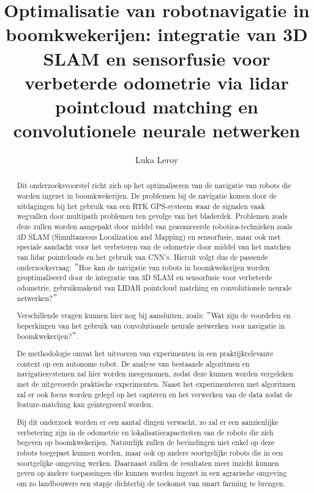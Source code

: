 \documentclass{hogent-article}
\title{Optimalisatie van robotnavigatie in boomkwekerijen: integratie van 3D SLAM en sensorfusie voor verbeterde odometrie via lidar pointcloud matching en convolutionele neurale netwerken}
\author{Luka Leroy}
\begin{document}
\begin{abstract}
  Dit onderzoeksvoorstel richt zich op het optimaliseren van de navigatie van robots die worden ingezet in boomkwekerijen.
  De problemen bij de navigatie komen door de uitdagingen bij het gebruik van een RTK GPS-systeem waar de signalen vaak wegvallen door multipath problemen ten gevolge van het bladerdek.
  Problemen zoals deze zullen worden aangepakt door middel van geavanceerde robotica-technieken zoals 3D SLAM (Simultaneous Localization and Mapping) en sensorfusie, maar ook met speciale aandacht voor het verbeteren van de odometrie door middel van het matchen van lidar pointclouds en het gebruik van CNN's.
  Hieruit volgt dus de passende onderzoeksvraag: \("\)Hoe kan de navigatie van robots in boomkwekerijen worden geoptimaliseerd door de integratie van 3D SLAM en sensorfusie voor verbeterde odometrie, gebruikmakend van LIDAR pointcloud matching en convolutionele neurale netwerken?\("\)\newline

  Verschillende vragen kunnen hier nog bij aansluiten, zoals: \("\)Wat zijn de voordelen en beperkingen van het gebruik van convolutionele neurale netwerken voor navigatie in boomkwekerijen?\("\).

  De methodologie omvat het uitvoeren van experimenten in een praktijkrelevante context op een autonome robot.
  De analyse van bestaande algoritmen en navigatiesystemen zal hier worden meegenomen, zodat deze kunnen worden vergeleken met de uitgevoerde praktische experimenten.
  Naast het experimenteren met algoritmen zal er ook focus worden gelegd op het capteren en het verwerken van de data zodat de feature-matching kan geïntegreerd worden.\newline

  Bij dit onderzoek worden er een aantal dingen verwacht, zo zal er een aanzienlijke verbetering zijn in de odometrie en lokalisatiecapaciteiten van de robots die zich begeven op boomkwekerijen.
  Natuurlijk zullen de bevindingen niet enkel op deze robots toegepast kunnen worden, maar ook op andere soortgelijke robots die in een soortgelijke omgeving werken.
  Daarnaast zullen de resultaten meer inzicht kunnen geven op andere toepassingen die kunnen worden ingezet in een agrarische omgeving om zo landbouwers een stapje dichterbij de toekomst van smart farming te brengen.

\end{abstract}

\tableofcontents



\printbibliography[heading=bibintoc]
\end{document}

